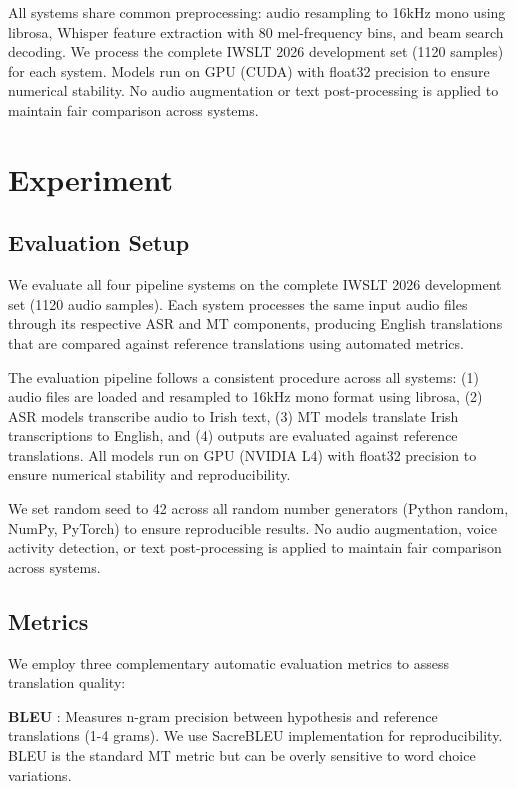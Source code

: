 \documentclass[11pt]{article}
\begin{document}
All systems share common preprocessing: audio resampling to 16kHz mono using librosa, Whisper feature extraction with 80 mel-frequency bins, and beam search decoding. We process the complete IWSLT 
2026 development set (1120 samples) for each system. Models run on GPU (CUDA) with float32 precision to ensure numerical stability. No audio augmentation or text post-processing is applied to maintain 
fair comparison across systems.

\section{Experiment}

\subsection{Evaluation Setup}

We evaluate all four pipeline systems on the complete IWSLT 2026 development set (1120 audio samples). Each system processes the same input audio files through its respective ASR and MT components, producing English translations that are compared against reference translations using automated metrics.

The evaluation pipeline follows a consistent procedure across all systems: (1) audio files are loaded and resampled to 16kHz mono format using librosa, (2) ASR models transcribe audio to Irish text, (3) MT models translate Irish transcriptions to English, and (4) outputs are evaluated against reference translations. All models run on GPU (NVIDIA L4) with float32 precision to ensure numerical stability and reproducibility.

We set random seed to 42 across all random number generators (Python random, NumPy, PyTorch) to ensure reproducible results. No audio augmentation, voice activity detection, or text post-processing is applied to maintain fair comparison across systems.

\subsection{Metrics}

We employ three complementary automatic evaluation metrics to assess translation quality:

\textbf{BLEU} \citep{papineni2002bleu}: Measures n-gram precision between hypothesis and reference translations (1-4 grams). We use SacreBLEU implementation for reproducibility. BLEU is the standard MT metric but can be overly sensitive to word choice variations.
\end{document}

